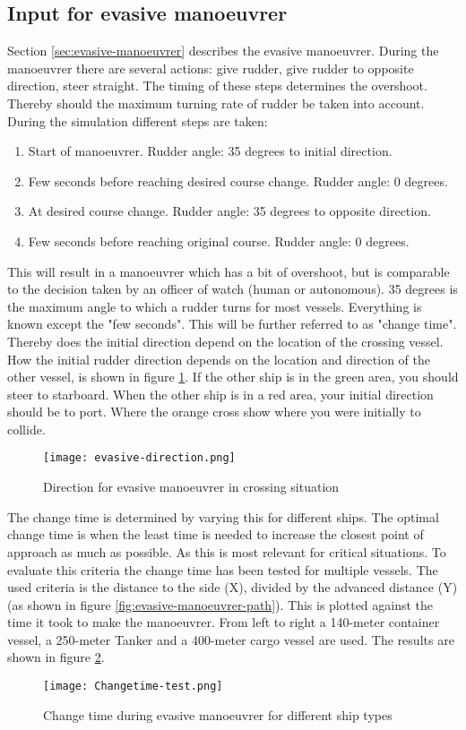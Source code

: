 \subsection{Input for evasive manoeuvrer}
Section \ref{sec:evasive-manoeuvrer} describes the evasive manoeuvrer. During the manoeuvrer there are several actions: give rudder, give rudder to opposite direction, steer straight. The timing of these steps determines the overshoot. Thereby should the maximum turning rate of rudder be taken into account.
During the simulation different steps are taken:
\begin{enumerate}
	\item Start of manoeuvrer. Rudder angle: 35 degrees to initial direction.
	\item Few seconds before reaching desired course change. Rudder angle: 0 degrees.
	\item At desired course change. Rudder angle: 35 degrees to opposite direction.
	\item Few seconds before reaching original course. Rudder angle: 0 degrees.
\end{enumerate}
This will result in a manoeuvrer which has a bit of overshoot, but is comparable to the decision taken by an officer of watch (human or autonomous). 35 degrees is the maximum angle to which a rudder turns for most vessels. Everything is known except the "few seconds". This will be further referred to as "change time". Thereby does the initial direction depend on the location of the crossing vessel. How the initial rudder direction depends on the location and direction of the other vessel, is shown in figure \ref{fig:evasive-direction}. If the other ship is in the green area, you should steer to starboard. When the other ship is in a red area, your initial direction should be to port. Where the orange cross show where you were initially to collide. 

\begin{figure}[p]
	\centering
	\texttt{[image: evasive-direction.png]}
	\caption{Direction for evasive manoeuvrer in crossing situation}
	\label{fig:evasive-direction} 
\end{figure}

The change time is determined by varying this for different ships. The optimal change time is when the least time is needed to increase the closest point of approach as much as possible. As this is most relevant for critical situations.
To evaluate this criteria the change time has been tested for multiple vessels. The used criteria is the distance to the side (X), divided by the advanced distance (Y) (as shown in figure \ref{fig:evasive-manoeuvrer-path}). This is plotted against the time it took to make the manoeuvrer. From left to right a 140-meter container vessel, a 250-meter Tanker and a 400-meter cargo vessel are used. The results are shown in figure \ref{fig:change-time}.
\begin{figure}[p]
	\centering
	\texttt{[image: Changetime-test.png]}
	\caption{Change time during evasive manoeuvrer for different ship types}
	\label{fig:change-time} 
\end{figure}

